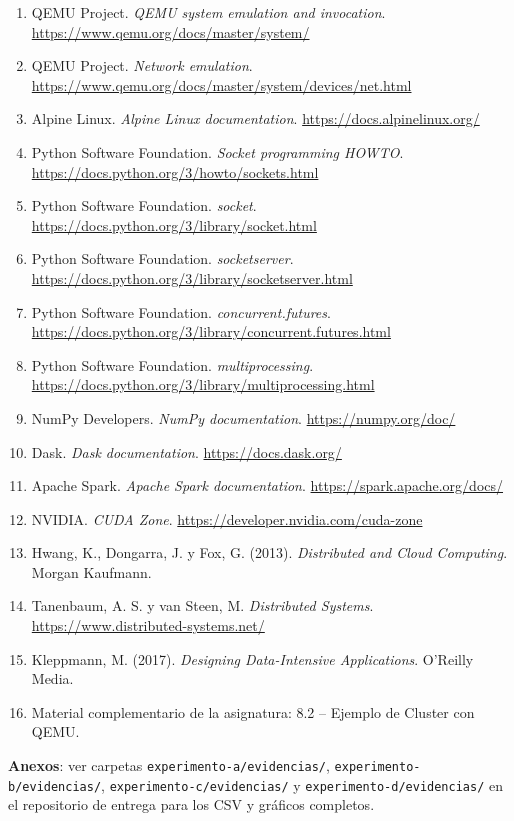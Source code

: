 \documentclass[11pt]{article}
\begin{document}
\begin{enumerate}
  \item QEMU Project. \textit{QEMU system emulation and invocation}. \url{https://www.qemu.org/docs/master/system/}
  \item QEMU Project. \textit{Network emulation}. \url{https://www.qemu.org/docs/master/system/devices/net.html}
  \item Alpine Linux. \textit{Alpine Linux documentation}. \url{https://docs.alpinelinux.org/}
  \item Python Software Foundation. \textit{Socket programming HOWTO}. \url{https://docs.python.org/3/howto/sockets.html}
  \item Python Software Foundation. \textit{socket}. \url{https://docs.python.org/3/library/socket.html}
  \item Python Software Foundation. \textit{socketserver}. \url{https://docs.python.org/3/library/socketserver.html}
  \item Python Software Foundation. \textit{concurrent.futures}. \url{https://docs.python.org/3/library/concurrent.futures.html}
  \item Python Software Foundation. \textit{multiprocessing}. \url{https://docs.python.org/3/library/multiprocessing.html}
  \item NumPy Developers. \textit{NumPy documentation}. \url{https://numpy.org/doc/}
  \item Dask. \textit{Dask documentation}. \url{https://docs.dask.org/}
  \item Apache Spark. \textit{Apache Spark documentation}. \url{https://spark.apache.org/docs/}
  \item NVIDIA. \textit{CUDA Zone}. \url{https://developer.nvidia.com/cuda-zone}
  \item Hwang, K., Dongarra, J. y Fox, G. (2013). \textit{Distributed and Cloud Computing}. Morgan Kaufmann.
  \item Tanenbaum, A. S. y van Steen, M. \textit{Distributed Systems}. \url{https://www.distributed-systems.net/}
  \item Kleppmann, M. (2017). \textit{Designing Data-Intensive Applications}. O'Reilly Media.
  \item Material complementario de la asignatura: 8.2 -- Ejemplo de Cluster con QEMU.
\end{enumerate}

\textbf{Anexos}: ver carpetas \texttt{experimento-a/evidencias/},
\texttt{experimento-b/evidencias/}, \texttt{experimento-c/evidencias/} y
\texttt{experimento-d/evidencias/} en el repositorio de entrega para los
CSV y gráficos completos.
\end{document}
